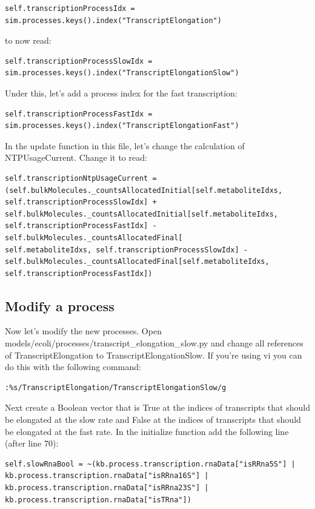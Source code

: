 \documentclass[12pt]{article}
\begin{document}
\begin{lstlisting}
self.transcriptionProcessIdx = sim.processes.keys().index("TranscriptElongation")
\end{lstlisting}
to now read: 
\begin{lstlisting}
self.transcriptionProcessSlowIdx = sim.processes.keys().index("TranscriptElongationSlow")
\end{lstlisting}

Under this, let’s add a process index for the fast transcription:

\begin{lstlisting}
self.transcriptionProcessFastIdx = sim.processes.keys().index("TranscriptElongationFast")
\end{lstlisting}

In the update function in this file, let’s change the calculation of NTPUsageCurrent. Change it to read: 

\begin{lstlisting}
self.transcriptionNtpUsageCurrent = (self.bulkMolecules._countsAllocatedInitial[self.metaboliteIdxs, self.transcriptionProcessSlowIdx] + self.bulkMolecules._countsAllocatedInitial[self.metaboliteIdxs, self.transcriptionProcessFastIdx] - self.bulkMolecules._countsAllocatedFinal[
self.metaboliteIdxs, self.transcriptionProcessSlowIdx] - self.bulkMolecules._countsAllocatedFinal[self.metaboliteIdxs, self.transcriptionProcessFastIdx])
\end{lstlisting}

\subsection{Modify a process}

Now let’s modify the new processes. Open models/ecoli/processes/transcript\_elongation\_slow.py and change all references of TranscriptElongation to TranscriptElongationSlow. If you’re using vi you can do this with the following command:

\lstset{language=bash}
\begin{lstlisting}
:%s/TranscriptElongation/TranscriptElongationSlow/g
\end{lstlisting}

Next create a Boolean vector that is True at the indices of transcripts that should be elongated at the slow rate and False at the indices of transcripts that should be elongated at the fast rate. In the initialize function add the following line (after line 70):

\lstset{language=Python}
\begin{lstlisting}
self.slowRnaBool = ~(kb.process.transcription.rnaData["isRRna5S"] | kb.process.transcription.rnaData["isRRna16S"] | kb.process.transcription.rnaData["isRRna23S"] | kb.process.transcription.rnaData["isTRna"])
\end{lstlisting}
\end{document}
